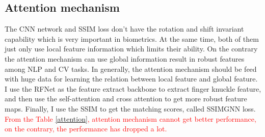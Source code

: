 \subsection{Attention mechanism}
The CNN network and SSIM loss don't have the rotation and shift invariant capability which is very important in biometrics. At the same time, both of them just only use local feature information which limits their ability. On the contrary the attention mechanism can use global information result in robust features among NLP and CV tasks. In generally, the attention mechanism should be feed with huge data for learning the relation between local feature and global feature. I use the RFNet as the feature extract backbone to extract finger knuckle feature, and then use the self-attention and cross attention to get more robust feature maps. Finally, I use the SSIM to get the matching scores, called SSIMGNN loss.\textcolor{red}{ From the Table \ref{attention}, attention mechanism cannot get better performance, on the contrary, the performance has dropped a lot.}

